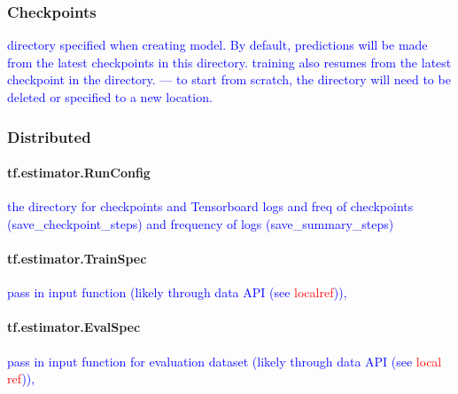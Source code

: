 




\subsubsection{Checkpoints}

\textcolor{blue}{directory specified when creating model. By default, predictions will be made from the latest checkpoints in this directory. training also resumes from the latest checkpoint in the directory. --- to start from scratch, the directory will need to be deleted or specified to a new location.}

\subsubsection{Distributed}



\paragraph{tf.estimator.RunConfig}


\textcolor{blue}{the directory for checkpoints and Tensorboard logs and freq of checkpoints (save\_checkpoint\_steps) and frequency of logs (save\_summary\_steps)  }

\paragraph{tf.estimator.TrainSpec}

\textcolor{blue}{pass in input function (likely through data API (see \textcolor{red}{localref})), }


\paragraph{tf.estimator.EvalSpec}

\textcolor{blue}{pass in input function for evaluation dataset (likely through data API (see \textcolor{red}{local ref})),}

